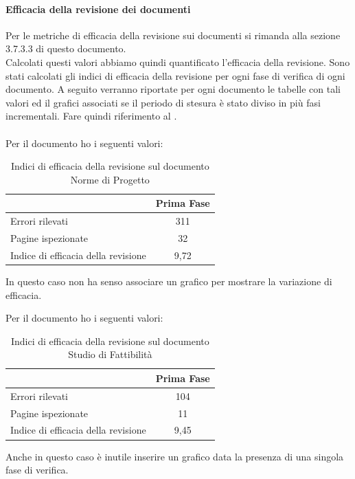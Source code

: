 					\paragraph{Efficacia della revisione dei documenti}
						Per le metriche di efficacia della revisione sui documenti si rimanda alla sezione 3.7.3.3 di questo documento.\\
						Calcolati questi valori abbiamo quindi quantificato l'efficacia della revisione.
						Sono stati calcolati gli indici di efficacia della revisione per ogni fase di verifica di ogni documento. A seguito verranno riportate per ogni documento le tabelle con tali valori ed il grafici associati se il periodo di stesura è stato diviso in più fasi incrementali. Fare quindi riferimento al .\\ \\
						Per il documento  ho i seguenti valori:				
						\begin{table}[H]\centering
							\begin{tabu}{| l | c |}
								\hline
													&Prima Fase   \\ \hline
												
								Errori rilevati				& 311	 \\ \hline
								Pagine ispezionate			& 32		 \\ \hline\hline
							
								Indice di efficacia della revisione 			& 9,72 	 \\ \hline
							\end{tabu}
							\caption{Indici di efficacia della revisione sul documento Norme di Progetto}
						\end{table}
						In questo caso non ha senso associare un grafico per mostrare la variazione di efficacia.
					
						Per il documento  ho i seguenti valori:			
						\begin{table}[H]\centering
							\begin{tabu}{| l | c |}
								\hline
													&Prima Fase   \\ \hline
												
								Errori rilevati				& 104	 \\ \hline
								Pagine ispezionate			& 11	 \\ \hline\hline
							
								Indice di efficacia della revisione 			 & 9,45	  \\ \hline
							\end{tabu}
							\caption{Indici di efficacia della revisione sul documento Studio di Fattibilità}
						\end{table}
						Anche in questo caso è inutile inserire un grafico data la presenza di una singola fase di verifica.\\
					
